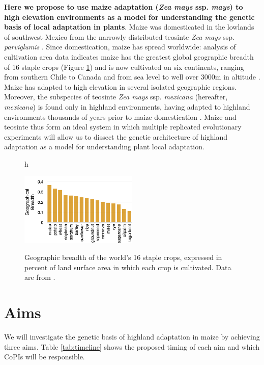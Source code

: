 {\bf Here we propose to use maize adaptation (\emph{Zea mays} ssp. \emph{mays}) to high elevation environments as a model for understanding the genetic basis of local adaptation in plants}.  Maize was domesticated in the lowlands of southwest Mexico from the narrowly distributed teosinte \emph{Zea mays} ssp. \emph{parviglumis} \citep[hereafter, \emph{parviglumis};][]{Matsuoka2002}. Since domestication, maize has spread worldwide: analysis of cultivation area data indicates maize has the greatest global geographic breadth of 16 staple crops (Figure \ref{fig:breadth}) and is now cultivated on six continents, ranging from southern Chile to Canada and from sea level to well over 3000m in altitude \citep{tenaillon2011european}. Maize has adapted to high elevation in several isolated geographic regions.  Moreover, the subspecies of teosinte \emph{Zea mays} ssp. \emph{mexicana} (hereafter, \emph{mexicana}) is found only in highland environments, having adapted to highland environments thousands of years prior to maize domestication \citep{Ross-Ibarra2009a, hufford2012inferences}. Maize and teosinte thus form an ideal system in which multiple replicated evolutionary experiments will allow us to dissect the genetic architecture of highland adaptation as a model for understanding plant local adaptation.

\begin{figure}h
  \centering
  \caption{Geographic breadth of the world's 16 staple crops, expressed in percent of land surface area in which each crop is cultivated. Data are from \citet{monfreda2008farming}. } 
   \includegraphics[width=0.5\textwidth]{breadth.png}
\label{fig:breadth}
\end{figure}

\section*{Aims}

We will investigate the genetic basis of highland adaptation in maize by achieving three aims. Table \ref{tab:timeline} shows the proposed timing of each aim and which CoPIs will be responsible.

